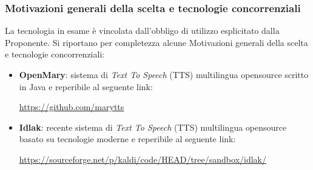 \documentclass[./../Technology Baseline.tex]{subfiles}
\begin{document}
\subsubsection{Motivazioni generali della scelta e tecnologie concorrenziali}

La tecnologia in esame è vincolata dall'obbligo di utilizzo esplicitato dalla Proponente. Si riportano per completezza alcune Motivazioni generali della scelta e tecnologie concorrenziali:

\begin{itemize}
	\item \textbf{OpenMary}: sistema di \textit{Text To Speech} (TTS) multilingua opensource scritto in Java e reperibile al seguente link:
	\begin{center}
		\url{https://github.com/marytts}
	\end{center}
	\item \textbf{Idlak}: recente sistema di \textit{Text To Speech} (TTS) multilingua opensource basato su tecnologie moderne e reperibile al seguente link:
	\begin{center}
	\url{https://sourceforge.net/p/kaldi/code/HEAD/tree/sandbox/idlak/}
	\end{center}
\end{itemize}
\end{document}
